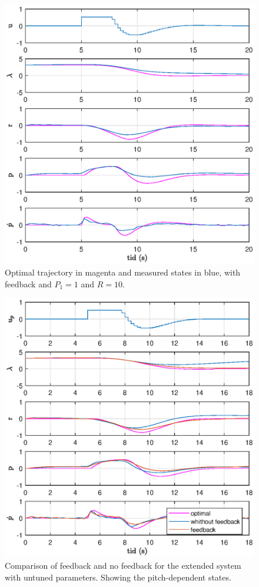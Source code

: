 \begin{figure}[h]
	\centering
	\includegraphics[width=\textwidth]{figures/plots/3_R=10.eps}
	\caption{Optimal trajectory in magenta and measured states in blue, with feedback and $P_1=1$ and $R=10$.}
\label{fig:3_r=10}
\end{figure}

\begin{figure}[h]
	\centering
	\includegraphics[width=\textwidth]{figures/plots/4_fb_vs_no_fb_UNTUNED_pitch_legend.eps}
	\caption{Comparison of feedback and no feedback for the extended system with untuned parameters. Showing the pitch-dependent states.}
\label{fig:4_untuned_pitch}
\end{figure}

